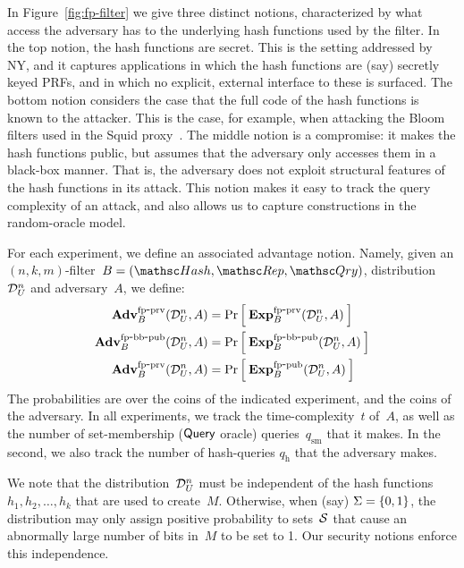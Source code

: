 In Figure~\ref{fig:fp-filter} we give three distinct notions, characterized by what access the adversary has to the underlying hash functions used by the filter.  In the top notion, the hash functions are secret.  This is the setting addressed by NY, and it captures applications in which the hash functions are (say) secretly keyed PRFs, and in which no explicit, external interface to these is surfaced.
%
The bottom notion considers the case that the full code of the hash functions is known to the attacker.  This is the case, for example, when attacking the Bloom filters used in the Squid proxy~\cite{xxx}.
%
The middle notion is a compromise: it makes the hash functions public, but assumes that the adversary only accesses them in a black-box manner.  That is, the adversary does not exploit structural features of the hash functions in its attack.  This notion makes it easy to track the query complexity of an attack, and also allows us to capture constructions in the random-oracle model. 

For each experiment, we define an associated advantage
notion.  Namely, given an $(n,k,m)$-filter~$B=(\Hash,\Rep,\Qry)$,
distribution~$\mathcal{D}_{U}^{n}$ and adversary~$A$, we define:
\begin{align*}
\mathrm{\mathbf{Adv}}^{\mathrm{fp\mbox{-}prv}}_{B}(\mathcal{D}_{U}^{n},A) &= \Pr\left[\: \mathrm{\mathbf{Exp}}^{\mathrm{fp\mbox{-}prv}}_{B}(\mathcal{D}_{U}^{n},A) \:\right] \\
\mathrm{\mathbf{Adv}}^{\mathrm{fp\mbox{-}bb\mbox{-}pub}}_{B}(\mathcal{D}_{U}^{n},A) &= \Pr\left[\: \mathrm{\mathbf{Exp}}^{\mathrm{fp\mbox{-}bb\mbox{-}pub}}_{B}(\mathcal{D}_{U}^{n},A) \:\right] \\
\mathrm{\mathbf{Adv}}^{\mathrm{fp\mbox{-}prv}}_{B}(\mathcal{D}_{U}^{n},A) &= \Pr\left[\: \mathrm{\mathbf{Exp}}^{\mathrm{fp\mbox{-}pub}}_{B}(\mathcal{D}_{U}^{n},A) \:\right]
\end{align*}
The probabilities are over the coins of the indicated experiment,
and the coins of the adversary.   In all experiments, we track the
time-complexity~$t$ of~$A$, as well as the number of set-membership
($\mathsf{Query}$ oracle) queries~$q_{\mathrm{sm}}$ that it makes.   In
the second, we also track the number of hash-queries
$q_{\mathrm{h}}$ that the adversary makes.


We note that the distribution~$\mathcal{D}_{U}^{n}$ must be independent of the hash functions $h_1,h_2,\ldots,h_k$ that are used to create~$M$.  Otherwise, when (say) $\Sigma=\{0,1\}$, the distribution may only assign positive probability to sets~${\cal S}$ that cause an abnormally large number of bits in~$M$ to be set to 1.  Our security notions enforce this independence.

